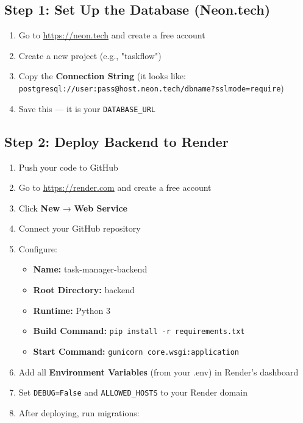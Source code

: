 \documentclass[12pt,a4paper]{article}
\begin{document}
\subsection{Step 1: Set Up the Database (Neon.tech)}

\begin{enumerate}
    \item Go to \url{https://neon.tech} and create a free account
    \item Create a new project (e.g., "taskflow")
    \item Copy the \textbf{Connection String} (it looks like:\\ \texttt{postgresql://user:pass@host.neon.tech/dbname?sslmode=require})
    \item Save this — it is your \texttt{DATABASE\_URL}
\end{enumerate}

\subsection{Step 2: Deploy Backend to Render}

\begin{enumerate}
    \item Push your code to GitHub
    \item Go to \url{https://render.com} and create a free account
    \item Click \textbf{New} → \textbf{Web Service}
    \item Connect your GitHub repository
    \item Configure:
    \begin{itemize}
        \item \textbf{Name:} task-manager-backend
        \item \textbf{Root Directory:} backend
        \item \textbf{Runtime:} Python 3
        \item \textbf{Build Command:} \texttt{pip install -r requirements.txt}
        \item \textbf{Start Command:} \texttt{gunicorn core.wsgi:application}
    \end{itemize}
    \item Add all \textbf{Environment Variables} (from your .env) in Render's dashboard
    \item Set \texttt{DEBUG=False} and \texttt{ALLOWED\_HOSTS} to your Render domain
    \item After deploying, run migrations:
\end{enumerate}
\end{document}
